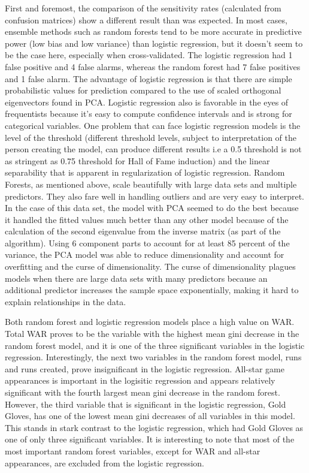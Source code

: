 \documentclass[letterpaper, 10 pt, conference]{ieeeconf}
\begin{document}
	First and foremost, the comparison of the sensitivity rates (calculated from confusion matrices) show a different result than was expected. In most cases, ensemble methods such as random forests tend to be more accurate in predictive power (low bias and low variance) than logistic regression, but it doesn't seem to be the case here, especially when cross-validated. The logistic regression had 1 false positive and 4 false alarms, whereas the random forest had 7 false positives and 1 false alarm. The advantage of logistic regression is that there are simple probabilistic values for prediction compared to the use of scaled orthogonal eigenvectors found in PCA. Logistic regression also is favorable in the eyes of frequentists because it's easy to compute confidence intervals and is strong for categorical variables. One problem that can face logistic regression models is the level of the threshold (different threshold levels, subject to interpretation of the person creating the model, can produce different results i.e a 0.5 threshold is not as stringent as 0.75 threshold for Hall of Fame induction) and the linear separability that is apparent in regularization of logistic regression.
    Random Forests, as mentioned above, scale beautifully with large data sets and multiple predictors. They also fare well in handling outliers and are very easy to interpret. In the case of this data set, the model with PCA seemed to do the best because it handled the fitted values much better than any other model because of the calculation of the second eigenvalue from the inverse matrix (as part of the algorithm). Using 6 component parts to account for at least 85 percent of the variance, the PCA model was able to reduce dimensionality and account for overfitting and the curse of dimensionality. The curse of dimensionality plagues models when there are large data sets with many predictors because an additional predictor increases the sample space exponentially, making it hard to explain relationships in the data. 

	Both random forest and logistic regression models place a high value on WAR. Total WAR proves to be the variable with the highest mean gini decrease in the random forest model, and it is one of the three significant variables in the logistic regression. Interestingly, the next two variables in the random forest model, runs and runs created, prove insignificant in the logistic regression. All-star game appearances is important in the logisitic regression and appears relatively significant with the fourth largest mean gini decrease in the random forest. However, the third variable that is significant in the logistic regression, Gold Gloves, has one of the lowest mean gini decreases of all variables in this model. This stands in stark contrast to the logistic regression, which had Gold Gloves as one of only three significant variables. It is interesting to note that most of the most important random forest variables, except for WAR and all-star appearances, are excluded from the logistic regression.
\end{document}
